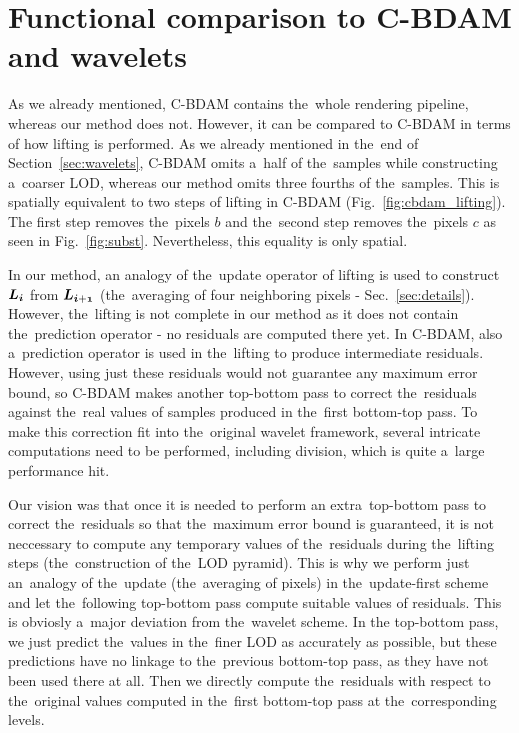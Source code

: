 \chapter{Functional comparison to C-BDAM and wavelets}\label{chap:cbdam_comp}

As we already mentioned, C-BDAM contains the~whole rendering pipeline, whereas our method does not. However, it can be compared to C-BDAM in terms of how lifting is performed. As we already mentioned in the~end of Section~\ref{sec:wavelets}, C-BDAM omits a~half of the~samples while constructing a~coarser LOD, whereas our method omits three fourths of the~samples. This is spatially equivalent to two steps of lifting in C-BDAM (Fig.~\ref{fig:cbdam_lifting}). The first step removes the~pixels $b$ and the~second step removes the~pixels $c$ as seen in Fig.~\ref{fig:subst}. Nevertheless, this equality is only spatial. 

In our method, an analogy of the~update operator of lifting is used to construct $\lnorm{i}$ from $\lnorm{i+1}$ (the~averaging of four neighboring pixels - Sec.~\ref{sec:details}). However, the~lifting is not complete in our method as it does not contain the~prediction operator - no residuals are computed there yet. In C-BDAM, also a~prediction operator is used in the~lifting to produce intermediate residuals. However, using just these residuals would not guarantee any maximum error bound, so C-BDAM makes another top-bottom pass to correct the~residuals against the~real values of samples produced in the~first bottom-top pass. To make this correction fit into the~original wavelet framework, several intricate computations need to be performed, including division, which is quite a~large performance hit.

Our vision was that once it is needed to perform an extra~top-bottom pass to correct the~residuals so that the~maximum error bound is guaranteed, it is not neccessary to compute any temporary values of the~residuals during the~lifting steps (the~construction of the~LOD pyramid). This is why we perform just an~analogy of the~update (the~averaging of pixels) in the~update-first scheme and let the~following top-bottom pass compute suitable values of residuals. This is obviosly a~major deviation from the~wavelet scheme. In the top-bottom pass, we just predict the~values in the~finer LOD as accurately as possible, but these predictions have no linkage to the~previous bottom-top pass, as they have not been used there at all. Then we directly compute the~residuals with respect to the~original values computed in the~first bottom-top pass at the~corresponding levels.


